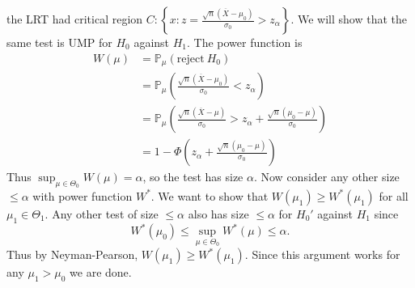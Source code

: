 \documentclass{article}
\begin{document}
the LRT had critical region $ C : \left\{x: z = \frac{\sqrt n(\overline X - \mu_0)}{\sigma_0} > z_\alpha\right\} $. We will show that the same test is UMP for $ H_0 $ against $ H_1 $. The power function is
\begin{align*}
	W(\mu) &= \mathbb P_\mu(\text{reject} \ H_0)\\
	       &= \mathbb P_\mu\left(\frac{\sqrt n (\overline X - \mu_0)}{\sigma_0} < z_\alpha\right)\\
	       &= \mathbb P_\mu\left(\frac{\sqrt n(\overline X - \mu)}{\sigma_0} > z_\alpha + \frac{\sqrt n(\mu_0-\mu)}{\sigma_0}\right) \\
	       &= 1- \Phi\left(z_\alpha + \frac{\sqrt n (\mu_0-\mu)}{\sigma_0}\right)
\end{align*}
Thus $ \sup_{\mu\in \Theta_0}W(\mu) =\alpha $, so the test has size $ \alpha $. Now consider any other size $ \le \alpha $ with power function $ W^* $. We want to show that $ W(\mu_1) \ge W^*(\mu_1) $ for all $ \mu_1\in \Theta_1 $. Any other test of size $ \le \alpha $ also has size $ \le \alpha $ for $ H_0' $ against $ H_1 $ since 
\[
	W^*(\mu_0)\le \sup_{\mu \in\Theta_0} W^*(\mu) \le \alpha.
\]
Thus by Neyman-Pearson, $ W(\mu_1) \ge W^*(\mu_1) $. Since this argument works for any $ \mu_1>\mu_0 $ we are done.
\end{document}

